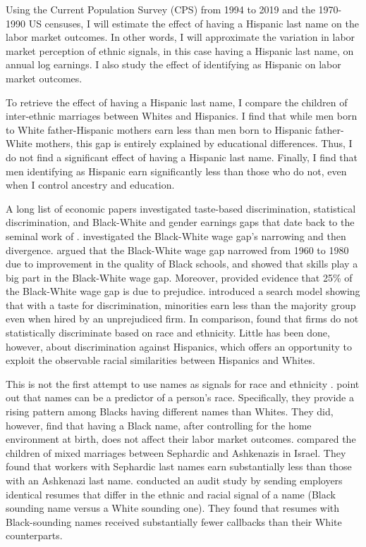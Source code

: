 \documentclass{wptemp}
\begin{document}
Using the Current Population Survey (CPS) from 1994 to 2019 and the 1970-1990 US censuses, I will estimate the effect of having a Hispanic last name on the labor market outcomes. In other words, I will approximate the variation in labor market perception of ethnic signals, in this case having a Hispanic last name, on annual log earnings. I also study the effect of identifying as Hispanic on labor market outcomes. 

To retrieve the effect of having a Hispanic last name, I compare the children of inter-ethnic marriages between Whites and Hispanics. I find that while men born to White father-Hispanic mothers earn less than men born to Hispanic father-White mothers, this gap is entirely explained by educational differences. Thus, I do not find a significant effect of having a Hispanic last name. Finally, I find that men identifying as Hispanic earn significantly less than those who do not, even when I control ancestry and education. 

A long list of economic papers investigated taste-based discrimination, statistical discrimination, and Black-White and gender earnings gaps that date back to the seminal work of \citet{becker2010economics}. \citet{bayer2018divergent} investigated the Black-White wage gap's narrowing and then divergence. \citet{card1992school} argued that the Black-White wage gap narrowed from 1960 to 1980 due to improvement in the quality of Black schools, and \citet{juhn1991accounting} showed that skills play a big part in the Black-White wage gap. Moreover,  \citet{charles2008prejudice} provided evidence that 25\% of the Black-White wage gap is due to prejudice. \citet{black1995discrimination} introduced a search model showing that with a taste for discrimination, minorities earn less than the majority group even when hired by an unprejudiced firm. In comparison, \citet{altonji2001employer} found that firms do not statistically discriminate based on race and ethnicity. Little has been done, however, about discrimination against Hispanics, which offers an opportunity to exploit the observable racial similarities between Hispanics and Whites.

This is not the first attempt to use names as signals for race and ethnicity \citep{fryer2004causes, rubinstein2014pride, bertrand2004emily}. \citet{fryer2004causes} point out that names can be a predictor of a person's race. Specifically, they provide a rising pattern among Blacks having different names than Whites. They did, however, find that having a Black name, after controlling for the home environment at birth, does not affect their labor market outcomes. \citet{rubinstein2014pride} compared the children of mixed marriages between Sephardic and Ashkenazis in Israel. They found that workers with Sephardic last names earn substantially less than those with an Ashkenazi last name. \citet{bertrand2004emily} conducted an audit study by sending employers identical resumes that differ in the ethnic and racial signal of a name (Black sounding name versus a White sounding one). They found that resumes with Black-sounding names received substantially fewer callbacks than their White counterparts. 
\end{document}

